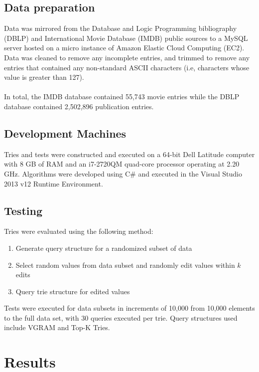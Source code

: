 \documentclass[pdftex,12pt,letter]{article}
\begin{document}
\subsection{Data preparation}
Data was mirrored from the Database and Logic Programming bibliography (DBLP) and International Movie Database (IMDB) public sources to a MySQL server hosted on a micro instance of Amazon Elastic Cloud Computing (EC2). Data was cleaned to remove any incomplete entries, and trimmed to remove any entries that contained any non-standard ASCII characters (i.e, characters whose value is greater than 127).\\
\\
In total, the IMDB database contained 55,743 movie entries while the DBLP database contained 2,502,896 publication entries.


\subsection{Development Machines}
Tries and tests were constructed and executed on a 64-bit Dell Latitude computer with 8 GB of RAM and an i7-2720QM quad-core processor operating at 2.20 GHz. Algorithms were developed using C\# and executed in the Visual Studio 2013 v12 Runtime Environment. 

\subsection{Testing}
Tries were evaluated using the following method:

\begin{enumerate}
\item Generate query structure for a randomized subset of data
\item Select random values from data subset and randomly edit values within $k$ edits
\item Query trie structure for edited values
\end{enumerate}

Tests were executed for data subsets in increments of 10,000 from 10,000 elements to the full data set, with 30 queries executed per trie. Query structures used include VGRAM and Top-K Tries.

\section{Results}
\end{document}
